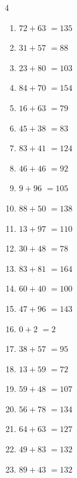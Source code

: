 \begin{multicols}{4}
\begin{enumerate}
  \item $72+63$
        $=135$

  \item $31+57$
        $=88$

  \item $23+80$
        $=103$

  \item $84+70$
        $=154$

  \item $16+63$
        $=79$

  \item $45+38$
        $=83$

  \item $83+41$
        $=124$

\columnbreak %

  \item $46+46$
        $=92$

  \item $9+96$
        $=105$

  \item $88+50$
        $=138$

  \item $13+97$
        $=110$

  \item $30+48$
        $=78$

  \item $83+81$
        $=164$

  \item $60+40$
        $=100$

  \item $47+96$
        $=143$

  \item $0+2$
        $=2$

  \item $38+57$
        $=95$

  \item $13+59$
        $=72$

  \item $59+48$
        $=107$

  \item $56+78$
        $=134$

  \item $64+63$
        $=127$

  \item $49+83$
        $=132$

  \item $89+43$
        $=132$


\end{enumerate}
\end{multicols}
